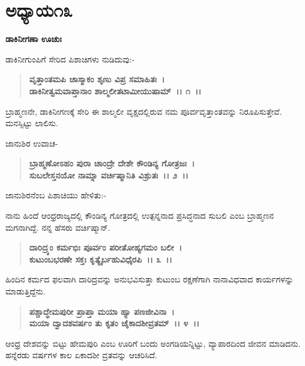 \newpage

\section*{ಅಧ್ಯಾಯ\enginline{-}೧೩}

\begin{flushleft}
\textbf{ಡಾಕಿನೀಗಣಾ ಊಚುಃ\enginline{-}}
\end{flushleft}

ಡಾಕಿನೀಗುಂಪಿಗೆ ಸೇರಿದ ಪಿಶಾಚಿಗಳು ನುಡಿದುವು:-

\begin{verse}
\textbf{ವೃತ್ತಾಂತಮಪಿ ಚಾಸ್ಮಾಕಂ ಶೃಣು ವಿಪ್ರ ಸಮಾಹಿತಃ~।}\\\textbf{ಡಾಕಿನೀತ್ವಮವಾಪ್ತಾನಾಂ ಶಾಲ್ಮಲೀತಟಾಮೀಯುಷಾಮ್~।। ೧~।।}
\end{verse}

ಬ್ರಾಹ್ಮಣನೇ, ಡಾಕಿನೀಗಣಕ್ಕೆ ಸೇರಿ ಈ ಶಾಲ್ಮಲೀ ವೃಕ್ಷದಲ್ಲಿರುವ ನಮ ಪೂರ್ವವೃತ್ತಾಂತವನ್ನು ನಿರೂಪಿಸುತ್ತೇವೆ. ಮನಸ್ಸಿಟ್ಟು ಲಾಲಿಸು.

\begin{flushleft}
ಜಾನುಶಿರ ಉವಾಚ-
\end{flushleft}

\begin{verse}
\textbf{ಬ್ರಾಹ್ಮಣೋಽಹಂ ಪುರಾ ಚಾಂದ್ರೇ ದೇಶೇ ಕೌಂಡಿನ್ಯ ಗೋತ್ರಜಃ~।}\\\textbf{ಸುಬಲೇಸ್ತನಯೋ ನಾಮ್ನಾ ವರ್ಚಿಷ್ಮಾನಿತಿ ವಿಶ್ರುತಃ~।। ೨~।।}
\end{verse}

ಜಾನುಶಿರನೆಂಬ ಪಿಶಾಚಿಯು ಹೇಳಿತು:-

ನಾನು ಹಿಂದೆ ಆಂಧ್ರರಾಜ್ಯದಲ್ಲಿ ಕೌಂಡಿನ್ಯ ಗೋತ್ರದಲ್ಲಿ ಉತ್ಪನ್ನನಾದ ಪ್ರಸಿದ್ಧನಾದ ಸುಬಲಿ ಎಂಬ ಬ್ರಾಹ್ಮಣನ ಮಗನಾಗಿದ್ದೆ. ನನ್ನ ಹೆಸರು ವರ್ಚಿಷ್ಮಾನ್.

\begin{verse}
\textbf{ದಾರಿದ್ರ್ಯಂ ಕರ್ಮಭಿಃ ಪೂರ್ವಂ ಪರೀತೋಹ್ಯಗಮಂ ಬಲೀ~।}\\\textbf{ಕುಟುಂಬಭರಣೇ ಸಕ್ತಃ ಕೃತ್ಯೈರ್ಬಹುವಿಧೈರಪಿ~।। ೩~।।}
\end{verse}

ಹಿಂದಿನ ಕರ್ಮದ ಫಲವಾಗಿ ದಾರಿದ್ರವನ್ನು ಅನುಭವಿಸುತ್ತಾ ಕುಟುಂಬ ರಕ್ಷಣೆಗಾಗಿ ನಾನಾವಿಧವಾದ ಕಾರ್ಯಗಳನ್ನು ಮಾಡುತ್ತಿದ್ದೆನು.

\begin{verse}
\textbf{ಪಶ್ಚಾದ್ಧೇಮಪುರೀ ಪ್ರಾಪ್ತಾ ಮಯಾ ಹ್ಯಾ ಪಣಜೀವಿನಾ~।}\\\textbf{ಮಯಾ ದ್ವಾದಶವರ್ಷಂ ತು ಕೃತಂ ಚೈಕಾದಶೀವ್ರತಮ್~।। ೪~।।}
\end{verse}

ಆಂಧ್ರ ದೇಶವನ್ನು ಬಿಟ್ಟು ಹೇಮಪುರಿ ಎಂಬ ಊರಿಗೆ ಬಂದು ಅಂಗಡಿಯನ್ನಿಟ್ಟು, ವ್ಯಾಪಾರದಿಂದ ಜೀವನ ಮಾಡಿದನು. ಹನ್ನೆರಡು ವರ್ಷಗಳ ಕಾಲ ಏಕಾದಶೀ ವ್ರತವನ್ನು ಆಚರಿಸಿದೆ.

